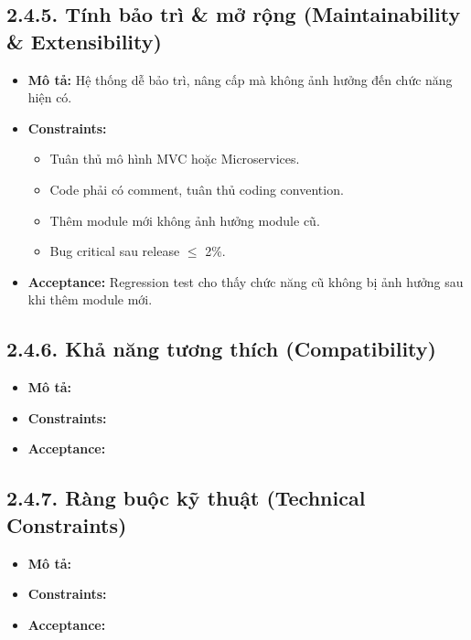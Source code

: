 
\subsection*{2.4.5. Tính bảo trì \& mở rộng (Maintainability \& Extensibility)}
\begin{itemize}
    \item \textbf{Mô tả:} Hệ thống dễ bảo trì, nâng cấp mà không ảnh hưởng đến chức năng hiện có.
    \item \textbf{Constraints:}
    \begin{itemize}
        \item Tuân thủ mô hình MVC hoặc Microservices.
        \item Code phải có comment, tuân thủ coding convention.
        \item Thêm module mới không ảnh hưởng module cũ.
        \item Bug critical sau release $\leq$ 2\%.
    \end{itemize}
    \item \textbf{Acceptance:} Regression test cho thấy chức năng cũ không bị ảnh hưởng sau khi thêm module mới.
\end{itemize}


\subsection*{2.4.6. Khả năng tương thích (Compatibility)}
\begin{itemize}
    \item \textbf{Mô tả:}
    \item \textbf{Constraints:}
    \item \textbf{Acceptance:}
\end{itemize}


\subsection*{2.4.7. Ràng buộc kỹ thuật (Technical Constraints)}
\begin{itemize}
    \item \textbf{Mô tả:}
    \item \textbf{Constraints:}
    \item \textbf{Acceptance:}
\end{itemize}

